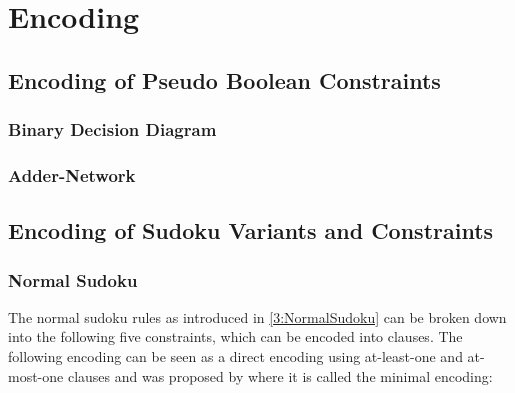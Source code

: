 \chapter{Encoding}


\section{Encoding of Pseudo Boolean Constraints}\label{EncodingOfPseudoBooleanConstraints}
\subsection{Binary Decision Diagram}
\subsection{Adder-Network}

\section{Encoding of Sudoku Variants and Constraints}
\lipsum[1]

\newpage
\subsection{Normal Sudoku}
The normal sudoku rules as introduced in \ref{3:NormalSudoku} can be broken down into the following five constraints, which can be encoded into clauses. The following encoding can be seen as a direct encoding using at-least-one and at-most-one clauses and was proposed by \cite{Lynce2006SudokuAsASATProblem} where it is called the minimal encoding:\\


